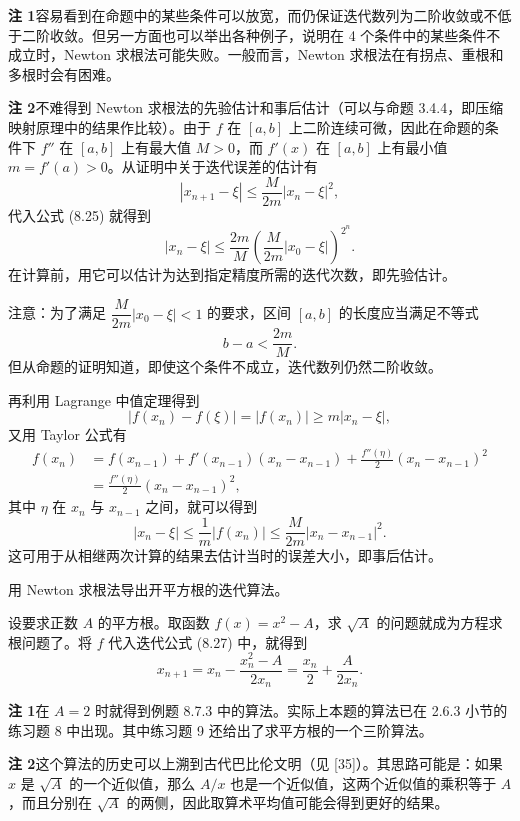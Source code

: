 \begin{xremark}
\textbf{注 1}\quad 容易看到在命题中的某些条件可以放宽，而仍保证迭代数列为二阶收敛或不低于二阶收敛。但另一方面也可以举出各种例子，说明在 4 个条件中的某些条件不成立时，Newton 求根法可能失败。一般而言，Newton 求根法在有拐点、重根和多根时会有困难。

\textbf{注 2}\quad 不难得到 Newton 求根法的先验估计和事后估计（可以与命题 3.4.4，即压缩映射原理中的结果作比较）。由于 $f$ 在 $[a,b]$ 上二阶连续可微，因此在命题的条件下 $f''$ 在 $[a,b]$ 上有最大值 $M>0$，而 $f'(x)$ 在 $[a,b]$ 上有最小值 $m=f'(a)>0$。从证明中关于迭代误差的估计有
\[
  |x_{n+1}-\xi|\le\frac{M}{2m}|x_n-\xi|^2,
\]
代入公式 (8.25) 就得到
\[
  |x_n-\xi|\le\frac{2m}{M}
  \left(\frac{M}{2m}|x_0-\xi|\right)^{2^n}.
\]
在计算前，用它可以估计为达到指定精度所需的迭代次数，即先验估计。

注意：为了满足 $\dfrac{M}{2m}|x_0-\xi|<1$ 的要求，区间 $[a,b]$ 的长度应当满足不等式
\[
  b-a<\frac{2m}{M}.
\]
但从命题的证明知道，即使这个条件不成立，迭代数列仍然二阶收敛。

再利用 Lagrange 中值定理得到
\[
  |f(x_n)-f(\xi)|=|f(x_n)|\ge m|x_n-\xi|,
\]
又用 Taylor 公式有
\begin{align*}
  f(x_n)
  &=f(x_{n-1})+f'(x_{n-1})(x_n-x_{n-1})
    +\frac{f''(\eta)}2(x_n-x_{n-1})^2\\
  &=\frac{f''(\eta)}2(x_n-x_{n-1})^2,
\end{align*}
其中 $\eta$ 在 $x_n$ 与 $x_{n-1}$ 之间，就可以得到
\[
  |x_n-\xi|\le\frac1m|f(x_n)|
  \le\frac{M}{2m}|x_n-x_{n-1}|^2.
\]
这可用于从相继两次计算的结果去估计当时的误差大小，即事后估计。
\end{xremark}

\begin{xexample}[8.7.4]
用 Newton 求根法导出开平方根的迭代算法。
\end{xexample}
\begin{xsolution}
设要求正数 $A$ 的平方根。取函数 $f(x)=x^2-A$，求 $\sqrt A$ 的问题就成为方程求根问题了。将 $f$ 代入迭代公式 (8.27) 中，就得到
\[
  x_{n+1}=x_n-\frac{x_n^2-A}{2x_n}
  =\frac{x_n}{2}+\frac{A}{2x_n}.
\]
\end{xsolution}

\begin{xremark}
\textbf{注 1}\quad 在 $A=2$ 时就得到例题 8.7.3 中的算法。实际上本题的算法已在 2.6.3 小节的练习题 8 中出现。其中练习题 9 还给出了求平方根的一个三阶算法。

\textbf{注 2}\quad 这个算法的历史可以上溯到古代巴比伦文明（见 [35]）。其思路可能是：如果 $x$ 是 $\sqrt A$ 的一个近似值，那么 $A/x$ 也是一个近似值，这两个近似值的乘积等于 $A$，而且分别在 $\sqrt A$ 的两侧，因此取算术平均值可能会得到更好的结果。
\end{xremark}


